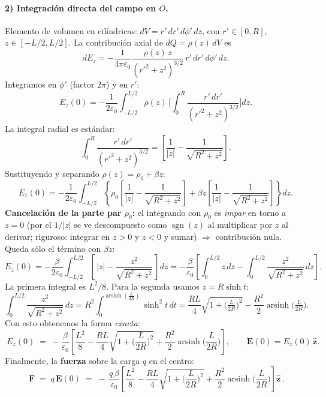\documentclass{article}
\begin{document}
\paragraph{2) Integración directa del campo en $O$.}
Elemento de volumen en cilíndricas: $dV=r'\,dr'\,d\phi'\,dz$, con $r'\in[0,R]$, $z\in[-L/2,L/2]$.  
La contribución axial de $dQ=\rho(z)\,dV$ es
\[
dE_z=-\frac{1}{4\pi\varepsilon_0}\frac{\rho(z)\,z}{(r'^2+z^2)^{3/2}}\,r'\,dr'\,d\phi'\,dz.
\]
Integramos en $\phi'$ (factor $2\pi$) y en $r'$:
\[
E_z(0)=-\frac{1}{2\varepsilon_0}\int_{-L/2}^{L/2}\rho(z)\,\Bigg[\int_0^R\frac{r'\,dr'}{(r'^2+z^2)^{3/2}}\Bigg]dz.
\]
La integral radial es estándar:
\[
\int_0^R\frac{r'\,dr'}{(r'^2+z^2)^{3/2}}
=\left[\frac{1}{|z|}-\frac{1}{\sqrt{R^2+z^2}}\right].
\]
Sustituyendo y separando $\rho(z)=\rho_0+\beta z$:
\[
E_z(0)=-\frac{1}{2\varepsilon_0}\int_{-L/2}^{L/2}\!\left\{\rho_0\!\left[\frac{1}{|z|}-\frac{1}{\sqrt{R^2+z^2}}\right]+\beta z\!\left[\frac{1}{|z|}-\frac{1}{\sqrt{R^2+z^2}}\right]\right\}\!dz.
\]
\textbf{Cancelación de la parte par $\rho_0$:} el integrando con $\rho_0$ es \emph{impar} en torno a $z=0$ (por el $1/|z|$ se ve descompuesto como $\operatorname{sgn}(z)$ al multiplicar por $z$ al derivar; riguroso: integrar en $z>0$ y $z<0$ y sumar) $\Rightarrow$ contribución nula.  
Queda sólo el término con $\beta z$:
\[
E_z(0)=-\frac{\beta}{2\varepsilon_0}\int_{-L/2}^{L/2}\!\left[\,|z|-\frac{z^2}{\sqrt{R^2+z^2}}\,\right]dz
= -\frac{\beta}{\varepsilon_0}\left[\int_{0}^{L/2}\! z\,dz-\int_{0}^{L/2}\!\frac{z^2}{\sqrt{R^2+z^2}}\,dz\right].
\]
La primera integral es $L^2/8$. Para la segunda usamos $z=R\sinh t$:
\[
\int_{0}^{L/2}\!\frac{z^2}{\sqrt{R^2+z^2}}\,dz
= R^2\!\int_{0}^{\operatorname{arsinh}\!\left(\frac{L}{2R}\right)}\!\sinh^2 t\,dt
= \frac{R L}{4}\sqrt{1+\Big(\tfrac{L}{2R}\Big)^2}-\frac{R^2}{2}\operatorname{arsinh}\!\Big(\tfrac{L}{2R}\Big).
\]
Con esto obtenemos la forma \emph{exacta}:
\begin{equation}\label{eq:Ez-cilindro-exacta}
\boxed{\
E_z(0)\;=\;-\frac{\beta}{\varepsilon_0}\left[
\frac{L^2}{8}
- \frac{R L}{4}\sqrt{1+\Big(\frac{L}{2R}\Big)^2}
+ \frac{R^2}{2}\operatorname{arsinh}\!\Big(\frac{L}{2R}\Big)
\right],\qquad \mathbf E(0)=E_z(0)\,\hat{\mathbf z}.
}
\end{equation}
Finalmente, la \textbf{fuerza} sobre la carga $q$ en el centro:
\begin{equation}\label{eq:F-cilindro}
\boxed{\ \mathbf F\;=\;q\,\mathbf E(0)\;=\; -\,\frac{q\,\beta}{\varepsilon_0}\left[
\frac{L^2}{8}
- \frac{R L}{4}\sqrt{1+\Big(\frac{L}{2R}\Big)^2}
+ \frac{R^2}{2}\operatorname{arsinh}\!\Big(\frac{L}{2R}\Big)
\right]\hat{\mathbf z}\ .}
\end{equation}
\end{document}
